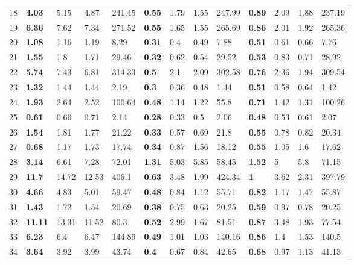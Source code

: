 \begin{table}[!tbp]
\begin{center}
\begin{tabular}{lllllllllllll}
18&\textbf{ 4.03 }&5.15&4.87&241.45&\textbf{ 0.55 }&1.79&1.55&247.99&\textbf{ 0.89 }&2.09&1.88&237.19\tabularnewline
19&\textbf{ 6.36 }&7.62&7.34&271.52&\textbf{ 0.55 }&1.65&1.55&265.69&\textbf{ 0.86 }&2.01&1.92&265.36\tabularnewline
20&\textbf{ 1.08 }&1.16&1.19&8.29&\textbf{ 0.31 }&0.4&0.49&7.88&\textbf{ 0.51 }&0.61&0.66&7.76\tabularnewline
21&\textbf{ 1.55 }&1.8&1.71&29.46&\textbf{ 0.32 }&0.62&0.54&29.52&\textbf{ 0.53 }&0.83&0.71&28.92\tabularnewline
22&\textbf{ 5.74 }&7.43&6.81&314.33&\textbf{ 0.5 }&2.1&2.09&302.58&\textbf{ 0.76 }&2.36&1.94&309.54\tabularnewline
23&\textbf{ 1.32 }&1.44&1.44&2.19&\textbf{ 0.3 }&0.36&0.48&1.44&\textbf{ 0.51 }&0.58&0.64&1.42\tabularnewline
24&\textbf{ 1.93 }&2.64&2.52&100.64&\textbf{ 0.48 }&1.14&1.22&55.8&\textbf{ 0.71 }&1.42&1.31&100.26\tabularnewline
25&\textbf{ 0.61 }&0.66&0.71&2.14&\textbf{ 0.28 }&0.33&0.5&2.06&\textbf{ 0.48 }&0.53&0.61&2.07\tabularnewline
26&\textbf{ 1.54 }&1.81&1.77&21.22&\textbf{ 0.33 }&0.57&0.69&21.8&\textbf{ 0.55 }&0.78&0.82&20.34\tabularnewline
27&\textbf{ 0.68 }&1.17&1.73&17.74&\textbf{ 0.34 }&0.87&1.56&18.12&\textbf{ 0.55 }&1.05&1.6&17.62\tabularnewline
28&\textbf{ 3.14 }&6.61&7.28&72.01&\textbf{ 1.31 }&5.03&5.85&58.45&\textbf{ 1.52 }&5&5.8&71.15\tabularnewline
29&\textbf{ 11.7 }&14.72&12.53&406.1&\textbf{ 0.63 }&3.48&1.99&424.34&\textbf{ 1 }&3.62&2.31&397.79\tabularnewline
30&\textbf{ 4.66 }&4.83&5.01&59.47&\textbf{ 0.48 }&0.84&1.12&55.71&\textbf{ 0.82 }&1.17&1.47&55.87\tabularnewline
31&\textbf{ 1.43 }&1.72&1.54&20.69&\textbf{ 0.38 }&0.75&0.63&20.25&\textbf{ 0.59 }&0.97&0.78&20.25\tabularnewline
32&\textbf{ 11.11 }&13.31&11.52&80.3&\textbf{ 0.52 }&2.99&1.67&81.51&\textbf{ 0.87 }&3.48&1.93&77.54\tabularnewline
33&\textbf{ 6.23 }&6.4&6.47&144.89&\textbf{ 0.49 }&1.01&1.03&140.16&\textbf{ 0.86 }&1.4&1.53&140.5\tabularnewline
34&\textbf{ 3.64 }&3.92&3.99&43.74&\textbf{ 0.4 }&0.67&0.84&42.65&\textbf{ 0.68 }&0.97&1.13&41.13\tabularnewline
\hline
\end{tabular}\end{center}
\end{table}
